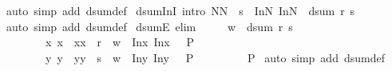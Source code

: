 \begin{isabellebody}
%
\isadelimproof
%
\endisadelimproof
%
\isatagproof
{}\isamarkupfalse%
\ {\isacharparenleft}auto\ simp\ add{\isacharcolon}\ dsum{\isacharunderscore}def{\isacharparenright}%
\endisatagproof
{\isafoldproof}%
%
\isadelimproof
\isanewline
%
\endisadelimproof
\isanewline
{}\isamarkupfalse%
\ dsum{\isacharunderscore}In{}I\ {\isacharbrackleft}intro{\isacharbrackright}{\isacharcolon}\ {\isachardoublequoteopen}{\isacharparenleft}N{\isacharcomma}N{\isacharprime}{\isacharparenright}\ {\isasymin}\ s\ {\isasymLongrightarrow}\ {\isacharparenleft}In{}{\isacharparenleft}N{\isacharparenright}{\isacharcomma}\ In{}{\isacharparenleft}N{\isacharprime}{\isacharparenright}{\isacharparenright}\ {\isasymin}\ dsum\ r\ s{\isachardoublequoteclose}\isanewline
%
\isadelimproof
%
\endisadelimproof
%
\isatagproof
{}\isamarkupfalse%
\ {\isacharparenleft}auto\ simp\ add{\isacharcolon}\ dsum{\isacharunderscore}def{\isacharparenright}%
\endisatagproof
{\isafoldproof}%
%
\isadelimproof
\isanewline
%
\endisadelimproof
\isanewline
{}\isamarkupfalse%
\ dsumE\ {\isacharbrackleft}elim{\isacharbang}{\isacharbrackright}{\isacharcolon}\ \isanewline
\ \ \ \ {\isachardoublequoteopen}{\isasymlbrakk}w\ {\isasymin}\ dsum\ r\ s{\isacharsemicolon}\ \ \ \isanewline
\ \ \ \ \ \ \ \ {\isasymAnd}x\ x{\isacharprime}{\isachardot}\ {\isasymlbrakk}\ {\isacharparenleft}x{\isacharcomma}x{\isacharprime}{\isacharparenright}\ {\isasymin}\ r{\isacharsemicolon}\ \ w\ {\isacharequal}\ {\isacharparenleft}In{}{\isacharparenleft}x{\isacharparenright}{\isacharcomma}\ In{}{\isacharparenleft}x{\isacharprime}{\isacharparenright}{\isacharparenright}\ {\isasymrbrakk}\ {\isasymLongrightarrow}\ P{\isacharsemicolon}\ \ \isanewline
\ \ \ \ \ \ \ \ {\isasymAnd}y\ y{\isacharprime}{\isachardot}\ {\isasymlbrakk}\ {\isacharparenleft}y{\isacharcomma}y{\isacharprime}{\isacharparenright}\ {\isasymin}\ s{\isacharsemicolon}\ \ w\ {\isacharequal}\ {\isacharparenleft}In{}{\isacharparenleft}y{\isacharparenright}{\isacharcomma}\ In{}{\isacharparenleft}y{\isacharprime}{\isacharparenright}{\isacharparenright}\ {\isasymrbrakk}\ {\isasymLongrightarrow}\ P\ \ \isanewline
\ \ \ \ \ {\isasymrbrakk}\ {\isasymLongrightarrow}\ P{\isachardoublequoteclose}\isanewline
%
\isadelimproof
%
\endisadelimproof
%
\isatagproof
{}\isamarkupfalse%
\ {\isacharparenleft}auto\ simp\ add{\isacharcolon}\ dsum{\isacharunderscore}def{\isacharparenright}%
\endisatagproof
{\isafoldproof}%
%
\isadelimproof
\isanewline
%
\endisadelimproof

\end{isabellebody}
